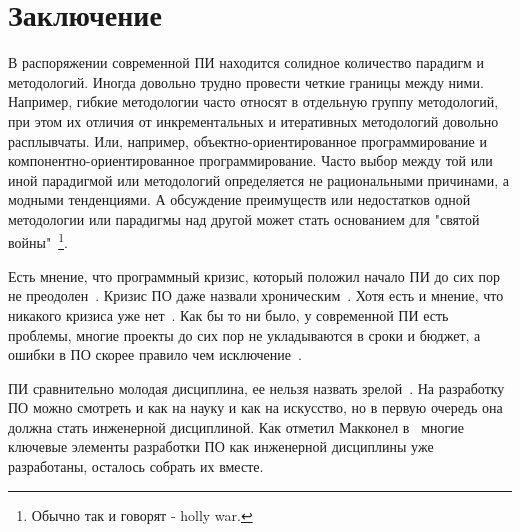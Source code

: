 \section{Заключение}

В распоряжении современной ПИ находится солидное количество парадигм и методологий. Иногда довольно трудно провести четкие границы между ними. Например, гибкие методологии часто относят в отдельную группу методологий, при этом их отличия от инкрементальных и итеративных методологий довольно расплывчаты. Или, например, объектно-ориентированное программирование и компонентно-ориентированное программирование. Часто выбор между той или иной парадигмой или методологий определяется не рациональными причинами, а модными тенденциями. А обсуждение преимуществ или недостатков одной методологии или парадигмы над другой может стать основанием для "святой войны"~\footnote{Обычно так и говорят - holly war.}.

Есть мнение, что программный кризис, который положил начало ПИ до сих пор не преодолен~\cite{Buettner:SEC}. Кризис ПО даже назвали хроническим~\cite{Gibbs:1994:TCS}. Хотя есть и мнение, что никакого кризиса уже нет~\cite{Colburn:2008:SEC}. Как бы то ни было, у современной ПИ есть проблемы, многие проекты до сих пор не укладываются в сроки и бюджет, а ошибки в ПО скорее правило чем исключение~\cite{Jackson:2011:FSE}.

ПИ сравнительно молодая дисциплина, ее нельзя назвать зрелой~\cite{Wang:2000:CSE}. На разработку ПО можно смотреть и как на науку и как на искусство, но в первую очередь она должна стать инженерной дисциплиной. Как отметил Макконел в~\cite{McConnell:1998:ASE} многие ключевые элементы разработки ПО как инженерной дисциплины уже разработаны, осталось собрать их вместе.
